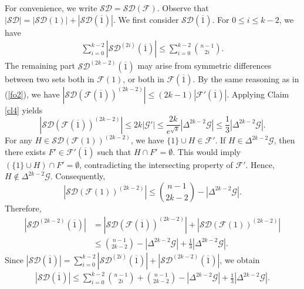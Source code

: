 \documentclass[11pt]{article}
\numberwithin{equation}{section}
\begin{document}
    For convenience, we write $\mathcal{SD}=\mathcal{SD(F)}$.
	Observe that $|\mathcal{SD}|=|\mathcal{SD}(1)|+|\mathcal{SD}(\overline{1})|$. We first consider $\mathcal{SD}(\overline{1})$.
	For $0\le i\le k-2$, we have 
     \begin{align*}
    \sum\limits_{i=0}^{k-2} |\mathcal{SD}^{(2i)}(\overline{1})| \leq \sum\limits_{i=0}^{k-2} \binom{n-1}{2i}. 
    \end{align*}
 The remaining part $\mathcal{SD}^{(2k-2)}(\overline{1})$ may arise from symmetric differences between two sets both in $\mathcal{F}(1)$, or both in $\mathcal{F}(\overline{1})$.
	By the same reasoning as in  (\ref{fo2}), we have  	$|\mathcal{SD}(\mathcal{F}(\overline{1}))^{(2k-2)}|\le (2k-1)|\mathcal{F}'(\overline{1})|$.
    Applying Claim \ref{cl4} yields
   $$|\mathcal{SD}(\mathcal{F}(\overline{1}))^{(2k-2)}| \le 2k|\mathcal{G}'|\le \frac{2k}{e^{\sqrt{k}}}|\Delta^{2k-2}{\mathcal{G}}|\le \frac{1}{3}|\Delta^{2k-2}{\mathcal{G}}|.$$
		For any $H\in \mathcal{SD}(\mathcal{F}(1))^{(2k-2)}$, we have ${\{1}\} \cup H \in \mathcal{F}'$. If $H\in \Delta^{2k-2}{\mathcal{G}}$, then there exists $F' \in \mathcal{F}'(\overline{1})$ such that $H\cap F'=\emptyset$. This would imply  $({\{1}\} \cup H ) \cap  F'=\emptyset$, contradicting the intersecting property of $\mathcal{F}'$.
        Hence, $H\notin \Delta^{2k-2}{\mathcal{G}}$.
        Consequently, 
	$$|\mathcal{SD}(\mathcal{F}(1))^{(2k-2)}|\le \binom{n-1}{2k-2}-|\Delta^{2k-2}{\mathcal{G}}|.$$
Therefore,
\begin{align*}
|\mathcal{SD}^{(2k-2)}(\overline{1})|&=|\mathcal{SD}(\mathcal{F}(\overline{1}))^{(2k-2)}|+|\mathcal{SD}(\mathcal{F}(1))^{(2k-2)}|\\
&\le \binom{n-1}{2k-2}-|\Delta^{2k-2}{\mathcal{G}}| +\frac{1}{3} |\Delta^{2k-2} \mathcal{G}|.
\end{align*}
Since  $|\mathcal{SD}(\overline{1})|= \sum\limits_{i=0}^{k-2} |\mathcal{SD}^{(2i)}(\overline{1})| +|\mathcal{SD}^{(2k-2)}(\overline{1})|$, we obtain
 \begin{align}
   |\mathcal{SD}(\overline{1})|\leq \sum\limits_{i=0}^{k-2} \binom{n-1}{2i}+\binom{n-1}{2k-2}-|\Delta^{2k-2}{\mathcal{G}}| +\frac{1}{3} |\Delta^{2k-2} \mathcal{G}|. \label{fo5}
    \end{align}
\end{document}
